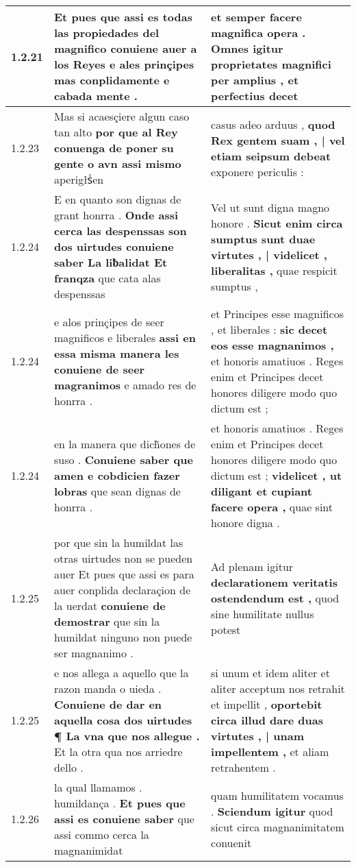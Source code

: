 \begin{tabular}{|p{1cm}|p{6.5cm}|p{6.5cm}|}
1.2.21 & Et pues que assi es todas las propiedades del magnifico \textbf{ conuiene auer a los Reyes } e ales prinçipes mas conplidamente e cabada mente . & et semper facere magnifica opera . \textbf{ Omnes igitur proprietates magnifici per amplius , } et perfectius decet \\\hline
1.2.23 & Mas si acaesçiere algun caso tan alto \textbf{ por que al Rey conuenga de poner su gente o avn assi mismo } aperigłsᷤen & casus adeo arduus , \textbf{ quod Rex gentem suam , | vel etiam seipsum debeat } exponere periculis : \\\hline
1.2.24 & E en quanto son dignas de grant honrra . \textbf{ Onde assi cerca las despenssas son dos uirtudes conuiene saber La liƀalidat Et franqza } que cata alas despenssas & Vel ut sunt digna magno honore . \textbf{ Sicut enim circa sumptus sunt duae virtutes , | videlicet , liberalitas , } quae respicit sumptus , \\\hline
1.2.24 & e alos prinçipes de seer magnificos e liberales \textbf{ assi en essa misma manera les conuiene de seer magranimos } e amado res de honrra . & et Principes esse magnificos , et liberales : \textbf{ sic decet eos esse magnanimos , } et honoris amatiuos . Reges enim et Principes decet honores diligere modo quo dictum est ; \\\hline
1.2.24 & en la manera que dich̃ones de suso . \textbf{ Conuiene saber que amen e cobdicien fazer lobras } que sean dignas de honrra . & et honoris amatiuos . Reges enim et Principes decet honores diligere modo quo dictum est ; \textbf{ videlicet , ut diligant et cupiant facere opera , } quae sint honore digna . \\\hline
1.2.25 & por que sin la humildat las otras uirtudes non se pueden auer Et pues que assi es para auer conplida declaraçion de la uerdat \textbf{ conuiene de demostrar } que sin la humildat ninguno non puede ser magnanimo . & Ad plenam igitur \textbf{ declarationem veritatis ostendendum est , } quod sine humilitate nullus potest \\\hline
1.2.25 & e nos allega a aquello que la razon manda o uieda . \textbf{ Conuiene de dar en aquella cosa dos uirtudes ¶ La vna que nos allegue . } Et la otra qua nos arriedre dello . & si unum et idem aliter et aliter acceptum nos retrahit et impellit , \textbf{ oportebit circa illud dare duas virtutes , | unam impellentem , } et aliam retrahentem . \\\hline
1.2.26 & la qual llamamos . humildança . \textbf{ Et pues que assi es conuiene saber } que assi commo cerca la magnanimidat & quam humilitatem vocamus . \textbf{ Sciendum igitur } quod sicut circa magnanimitatem conuenit \\\hline

\end{tabular}
